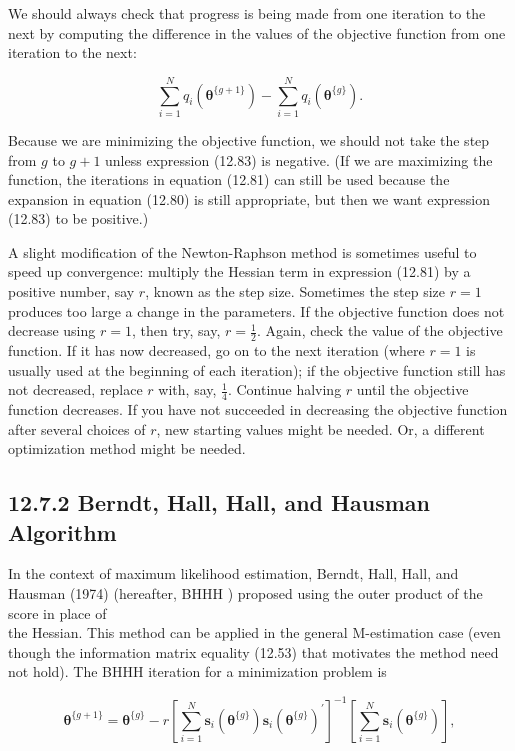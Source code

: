 \documentclass[10pt]{article}
\begin{document}
We should always check that progress is being made from one iteration to the next by computing the difference in the values of the objective function from one iteration to the next:


\begin{equation*}
\sum_{i=1}^{N} q_{i}\left(\boldsymbol{\theta}^{\{g+1\}}\right)-\sum_{i=1}^{N} q_{i}\left(\boldsymbol{\theta}^{\{g\}}\right) . \tag{12.83}
\end{equation*}


Because we are minimizing the objective function, we should not take the step from $g$ to $g+1$ unless expression (12.83) is negative. (If we are maximizing the function, the iterations in equation (12.81) can still be used because the expansion in equation (12.80) is still appropriate, but then we want expression (12.83) to be positive.)

A slight modification of the Newton-Raphson method is sometimes useful to speed up convergence: multiply the Hessian term in expression (12.81) by a positive number, say $r$, known as the step size. Sometimes the step size $r=1$ produces too large a change in the parameters. If the objective function does not decrease using $r=1$, then try, say, $r=\frac{1}{2}$. Again, check the value of the objective function. If it has now decreased, go on to the next iteration (where $r=1$ is usually used at the beginning of each iteration); if the objective function still has not decreased, replace $r$ with, say, $\frac{1}{4}$. Continue halving $r$ until the objective function decreases. If you have not succeeded in decreasing the objective function after several choices of $r$, new starting values might be needed. Or, a different optimization method might be needed.

\subsection*{12.7.2 Berndt, Hall, Hall, and Hausman Algorithm}
In the context of maximum likelihood estimation, Berndt, Hall, Hall, and Hausman (1974) (hereafter, BHHH ) proposed using the outer product of the score in place of\\
the Hessian. This method can be applied in the general M-estimation case (even though the information matrix equality (12.53) that motivates the method need not hold). The BHHH iteration for a minimization problem is


\begin{equation*}
\boldsymbol{\theta}^{\{g+1\}}=\boldsymbol{\theta}^{\{g\}}-r\left[\sum_{i=1}^{N} \mathbf{s}_{i}\left(\boldsymbol{\theta}^{\{g\}}\right) \mathbf{s}_{i}\left(\boldsymbol{\theta}^{\{g\}}\right)^{\prime}\right]^{-1}\left[\sum_{i=1}^{N} \mathbf{s}_{i}\left(\boldsymbol{\theta}^{\{g\}}\right)\right], \tag{12.84}
\end{equation*}
\end{document}
